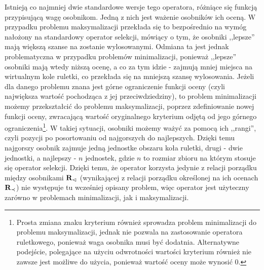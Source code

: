 \documentclass[./FM_mgr.tex]{subfiles}
\begin{document}
	Istnieją co najmniej dwie standardowe wersje tego operatora, różniące się funkcją przypisującą wagę osobnikom. 
	Jedną z nich jest ważenie osobników ich oceną.
	W przypadku problemu maksymalizacji przekłada się to bezpośrednio na wymóg nałożony na standardowy operator selekcji, mówiący o tym, że osobniki ,,lepsze'' mają większą szanse na zostanie wylosowanymi.
	Odmiana ta jest jednak problematyczna w przypadku problemów minimalizacji, ponieważ ,,lepsze'' osobniki mają wtedy niższą ocenę, a co za tym idzie - zajmują mniej miejsca na wirtualnym kole ruletki, co przekłada się na mniejszą szansę wylosowania.
	Jeżeli dla danego problemu znana jest górne ograniczenie funkcji oceny (czyli największa wartość pochodząca z jej przeciwdziedziny), to problem minimalizacji możemy przekształcić do problemu maksymalizacji, poprzez zdefiniowanie nowej funkcji oceny, zwracającą wartość oryginalnego kryterium odjętą od jego górnego ograniczenia\footnote{
		Prosta zmiana znaku kryterium również sprowadza problem minimalizacji do problemu maksymalizacji, jednak nie pozwala na zastosowanie operatora ruletkowego, ponieważ waga osobnika musi być dodatnia. 
		Alternatywne podejście, polegające na użyciu odwrotności wartości kryterium również nie zawsze jest możliwe do użycia, ponieważ wartość oceny może wynosić 0.
	}.
	W takiej sytuacji, osobniki możemy ważyć za pomocą ich ,,rangi'', czyli pozycji po posortowaniu od najgorszych do najlepszych.
	Dzięki temu najgorszy osobnik zajmuje jedną jednostke obszaru koła ruletki, drugi - dwie jednostki, a najlepszy - $n$ jednostek, gdzie $n$ to rozmiar zbioru na którym stosuje się operator selekcji.
	Dzięki temu, że operator korzysta jedynie z relacji porządku między osobnikami ${\mathbf{R}}_{\lhd}$ (wynikającej z relacji porządku określonej na ich ocenach ${\mathbf{R}}_{\prec}$) nie występuje tu wcześniej opisany problem, więc operator jest użyteczny zarówno w problemach minimalizacji, jak i maksymalizacji.
	
\end{document}
